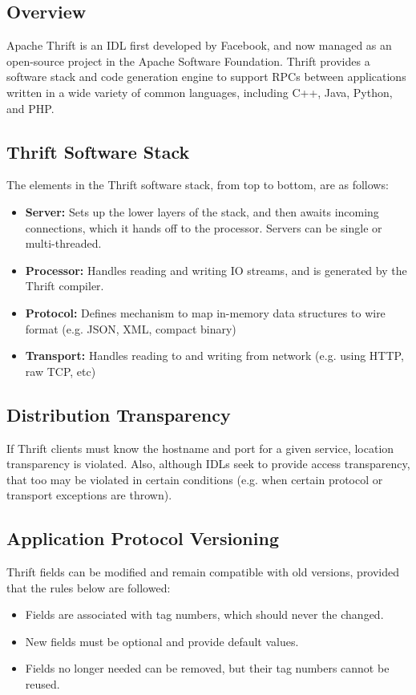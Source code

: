 \documentclass[12pt,titlepage]{article}
\begin{document}
    \subsection{Overview}
      Apache Thrift is an IDL first developed by Facebook, and now managed as an open-source project in the Apache Software Foundation. Thrift provides
      a software stack and code generation engine to support RPCs between applications written in a wide variety of common languages, including C++, Java,
      Python, and PHP.

    \subsection{Thrift Software Stack}
      The elements in the Thrift software stack, from top to bottom, are as follows:
      \begin{itemize}
        \item \textbf{Server:} Sets up the lower layers of the stack, and then awaits incoming connections, which it hands off to the processor. Servers
        can be single or multi-threaded.
        \item \textbf{Processor:} Handles reading and writing IO streams, and is generated by the Thrift compiler.
        \item \textbf{Protocol:} Defines mechanism to map in-memory data structures to wire format (e.g. JSON, XML, compact binary)
        \item \textbf{Transport:} Handles reading to and writing from network (e.g. using HTTP, raw TCP, etc)
      \end{itemize}

    \subsection{Distribution Transparency}
      If Thrift clients must know the hostname and port for a given service, location transparency is violated. Also, although IDLs seek to provide access
      transparency, that too may be violated in certain conditions (e.g. when certain protocol or transport exceptions are thrown).

    \subsection{Application Protocol Versioning}
      Thrift fields can be modified and remain compatible with old versions, provided that the rules below are followed:
      \begin{itemize}
        \item Fields are associated with tag numbers, which should never the changed.
        \item New fields must be optional and provide default values.
        \item Fields no longer needed can be removed, but their tag numbers cannot be reused.
      \end{itemize}
\end{document}
